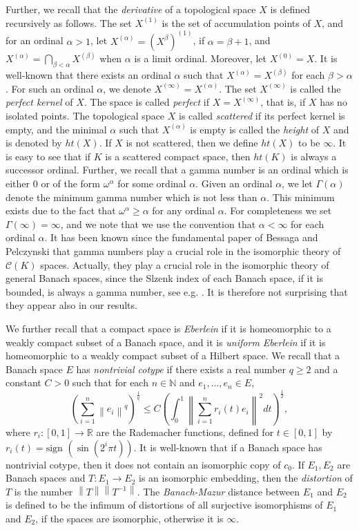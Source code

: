 \documentclass{amsart}
\numberwithin{equation}{section}
\theoremstyle{definition}
\def\C{\mathcal C}
\def\en{\mathbb N}
\def\er{\mathbb R}
\newcommand{\norm}[1]{\left\|#1\right\|}
\begin{document}
Further, we recall that the \emph{derivative} of a topological space $X$ is defined recursively as follows. The set $X^{(1)}$ is the set of accumulation points of $X$, and for an ordinal $\alpha>1$, let $X^{(\alpha)}=(X^{\beta})^{(1)}$, if $\alpha=\beta+1$, and $X^{(\alpha)}=\bigcap_{\beta<\alpha} X^{(\beta)}$ when $\alpha$ is a limit ordinal. Moreover, let $X^{(0)}=X$. It is well-known that there exists an ordinal $\alpha$ such that $X^{(\alpha)}=X^{(\beta)}$ for each $\beta>\alpha$. For such an ordinal $\alpha$, we denote $X^{(\infty)}=X^{(\alpha)}$. The set $X^{(\infty)}$ is called the \emph{perfect kernel} of $X$. The space is called \emph{perfect} if $X=X^{(\infty)}$, that is, if $X$ has no isolated points.
The topological space $X$ is called \emph{scattered} if its perfect kernel is empty, and the minimal $\alpha$ such that $X^{(\alpha)}$ is empty is called the \emph{height} of $X$ and is denoted by $ht(X)$. If $X$ is not scattered, then we define $ht(X)$ to be $\infty$. It is easy to see that if $K$ is a scattered compact space, then $ht(K)$ is always a successor ordinal.
Further, we recall that a gamma number is an ordinal which is either $0$ or of the form $\omega^{\alpha}$ for some ordinal $\alpha$. Given an ordinal $\alpha$, we let $\Gamma(\alpha)$ denote the minimum gamma number which is not less than $\alpha$. This minimum exists due to the fact that $\omega^{\alpha} \geq \alpha$ for any ordinal $\alpha$. For completeness we set $\Gamma(\infty)=\infty$, and we note that we use the convention that $\alpha<\infty$ for each ordinal $\alpha$. It has been known since the fundamental paper of Bessaga and Pelczynski \cite{BessagaPelcynski_classification} that gamma numbers play a crucial role in the isomorphic theory of $\C(K)$ spaces. Actually, they play a crucial role in the isomorphic theory of general Banach spaces, since the Slzenk index of each Banach space, if it is bounded, is always a gamma number, see e.g. \cite[Proposition 3.3]{Lancien2006}. It is therefore not surprising that they appear also in our results.

 We further recall that a compact space is \emph{Eberlein} if it is homeomorphic to a weakly compact subset of a Banach space, and it is \emph{uniform Eberlein} if it is homeomorphic to a weakly compact subset of a Hilbert space. We recall that a Banach space $E$ has \emph{nontrivial cotype} if there exists a real number $q \geq 2$ and a constant $C>0$ such that for each $n \in \en$ and $e_1, \ldots, e_n \in E$, 
\[ (\sum_{i=1}^n \norm{e_i}^q)^{\frac{1}{q}} \leq C(\int_{0}^1 \norm{\sum_{i=1}^n r_i(t) e_i}^2 dt)^{\frac{1}{2}},\]
where $r_i:[0, 1] \rightarrow \er$ are the Rademacher functions, defined for $t \in [0, 1]$ by $r_i(t)=\text{sign } (\sin(2^i \pi t))$. It is well-known that if a Banach space has nontrivial cotype, then it does not contain an isomorphic copy of $c_0$. If $E_1, E_2$ are Banach spaces and $T: E_1 \rightarrow E_2$ is an isomorphic embedding, then the \emph{distortion} of $T$ is the number $\norm{T}\norm{T^{-1}}$. The \emph{Banach-Mazur} distance between $E_1$ and $E_2$ is defined to be the infimum of distortions of all surjective isomorphisms of $E_1$ and $E_2$, if the spaces are isomorphic, otherwise it is $\infty$. 
\end{document}
